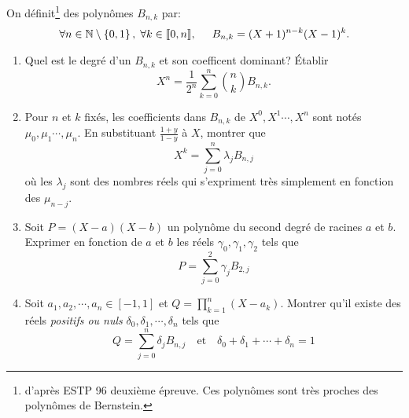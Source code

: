 On définit\footnote{d'apr{\`e}s ESTP 96 deuxi{\`e}me {\'e}preuve. Ces polynômes sont très proches des polynômes de Bernstein.} des polynômes $B_{n,k}$ par:
\[
\forall n \in \mathbb{N} \setminus\left\lbrace 0, 1\right\rbrace, \;  \forall k \in \llbracket 0,n \rrbracket, \hspace{0.5cm} B_{n,k}=(X+1)^{n-k}(X-1)^{k}.
\]

\begin{enumerate}
\item Quel est le degré d'un $B_{n,k}$ et son coefficent dominant? {\'E}tablir
\[
X^{n} = \frac{1}{2^{n}}\sum _{k=0}^{n} \binom{n}{k} B_{n,k}.
\]

\item Pour $n$ et $k$ fix{\'e}s, les coefficients dans $B_{n,k}$ de $X^{0},X^{1}\cdots,X^{n}$ sont notés $\mu_{0},\mu_{1}\cdots,\mu_{n}$. En substituant $\frac{1+y}{1-y}$ {\`a} $X$, montrer que
\[
X^{k}=\sum _{j=0}^{n}\lambda_{j}B_{n,j}
\]
o{\`u} les $\lambda_{j}$ sont des nombres r{\'e}els qui s'expriment tr{\`e}s simplement en fonction des $\mu_{n-j}$. 

\item Soit $P=(X-a)(X-b)$ un polyn{\^o}me du second degr{\'e} de racines $a$ et $b$. Exprimer en fonction de $a$ et $b$ les r{\'e}els $\gamma_{0},\gamma_{1},\gamma_{2}$ tels que
\[
P=\sum _{j=0}^{2}\gamma_{j}B_{2,j}
\]

\item Soit $a_{1},a_{2},\cdots,a_{n} \in [-1,1]$ et $Q=\prod_{k=1}^{n}(X-a_{k})$.\newline
Montrer qu'il existe des r{\'e}els \emph{positifs ou nuls} $\delta_{0},\delta_{1},\cdots,\delta_{n}$ tels que
\[
Q=\sum _{j=0}^{n}\delta_{j}B_{n,j} \mathrm{\quad et \quad} \delta_{0}+\delta_{1}+\cdots+\delta_{n}=1
\]
\end{enumerate}
